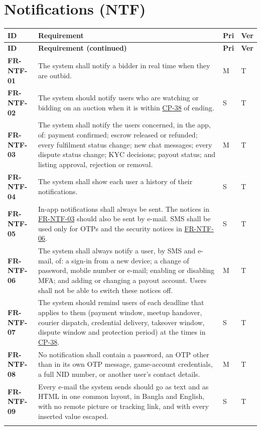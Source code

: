 \documentclass[11pt,a4paper]{report}
\makeatletter
\newenvironment{reqs}{%
  \small
  \begin{longtable}{@{}>{\raggedright\arraybackslash}p{2.35cm}
                       >{\raggedright\arraybackslash}p{10.3cm}
                       >{\centering\arraybackslash}p{0.7cm}
                       >{\centering\arraybackslash}p{0.7cm}@{}}
  \toprule
  \textbf{ID} & \textbf{Requirement} & \textbf{Pri} & \textbf{Ver} \\
  \midrule
  \endfirsthead
  \toprule
  \textbf{ID} & \textbf{Requirement (continued)} & \textbf{Pri} & \textbf{Ver} \\
  \midrule
  \endhead
  \bottomrule
  \endfoot
}{\end{longtable}}
\newcommand{\req}[5]{\leavevmode\textbf{#1}\hypertarget{#1}{} & #5 & #2 & #3 \\ \addlinespace[2pt]}
\newcommand{\rr}[1]{\hyperlink{#1}{#1}}
\newcommand{\cp}[1]{\hyperlink{#1}{#1}}
\makeatother
\begin{document}
\section{Notifications (NTF)}
\begin{reqs}
\req{FR-NTF-01}{M}{T}{FR-74}{The system shall notify a bidder in real time when they are outbid.}
\req{FR-NTF-02}{S}{T}{FR-75}{The system should notify users who are watching or bidding on an auction when it is within \cp{CP-38} of ending.}
\req{FR-NTF-03}{M}{T}{FR-76}{The system shall notify the users concerned, in the app, of: payment confirmed; escrow released or refunded; every fulfilment status change; new chat messages; every dispute status change; KYC decisions; payout status; and listing approval, rejection or removal.}
\req{FR-NTF-04}{S}{T}{FR-77}{The system shall show each user a history of their notifications.}
\req{FR-NTF-05}{S}{T}{new}{In-app notifications shall always be sent. The notices in \rr{FR-NTF-03} should also be sent by e-mail. SMS shall be used only for OTPs and the security notices in \rr{FR-NTF-06}.}
\req{FR-NTF-06}{M}{T}{new}{The system shall always notify a user, by SMS and e-mail, of: a sign-in from a new device; a change of password, mobile number or e-mail; enabling or disabling MFA; and adding or changing a payout account. Users shall not be able to switch these notices off.}
\req{FR-NTF-07}{S}{T}{new}{The system should remind users of each deadline that applies to them (payment window, meetup handover, courier dispatch, credential delivery, takeover window, dispute window and protection period) at the times in \cp{CP-38}.}
\req{FR-NTF-08}{M}{T}{new}{No notification shall contain a password, an OTP other than in its own OTP message, game-account credentials, a full NID number, or another user's contact details.}
\req{FR-NTF-09}{S}{T}{new}{Every e-mail the system sends should go as text and as HTML in one common layout, in Bangla and English, with no remote picture or tracking link, and with every inserted value escaped.}
\end{reqs}
\end{document}
